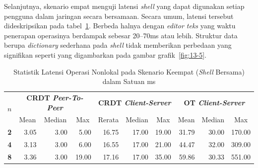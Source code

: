 Selanjutnya, skenario empat menguji latensi \textit{shell} yang dapat digunakan setiap pengguna dalam jaringan secara bersamaan. Secara umum, latensi tersebut dideskripsikan pada tabel~\ref{tab:latency-4}. Berbeda halnya dengan \textit{editor teks} yang waktu penerapan operasinya berdampak sebesar 20--70ms atau lebih. Struktur data berupa \textit{dictionary} sederhana pada \textit{shell} tidak memberikan perbedaan yang signifikan seperti yang digambarkan pada gambar grafik~\ref{fig:13-5}.

\begin{table}[H]
 \centering

 \caption{Statistik Latensi Operasi Nonlokal pada Skenario Keempat (\textit{Shell} Bersama) dalam Satuan ms}
 \label{tab:latency-4}
 \begin{tabular}{|c|rrr|rrr|rrr|}
  \hline
\multirow{2}{*}{$n$} & \multicolumn{3}{c|}{\textbf{CRDT \textit{Peer-To-Peer}}} & \multicolumn{3}{c|}{\textbf{CRDT \textit{Client-Server}}} & \multicolumn{3}{c|}{\textbf{OT \textit{Client-Server}}} \\ \cline{2-10}
 & \multicolumn{1}{c|}{Mean} & \multicolumn{1}{c|}{Median} & \multicolumn{1}{c|}{Max} & \multicolumn{1}{c|}{Rerata} & \multicolumn{1}{c|}{Median} & \multicolumn{1}{c|}{Max} & \multicolumn{1}{c|}{Mean} & \multicolumn{1}{c|}{Median} & \multicolumn{1}{c|}{Max} \\ \hline
\textbf{2} & \multicolumn{1}{r|}{3.05} & \multicolumn{1}{r|}{3.00} & 5.00 & \multicolumn{1}{r|}{16.75} & \multicolumn{1}{r|}{17.00} & 19.00 & \multicolumn{1}{r|}{31.79} & \multicolumn{1}{r|}{30.00} & 170.00 \\ \hline
\textbf{4} & \multicolumn{1}{r|}{3.13} & \multicolumn{1}{r|}{3.00} & 6.00 & \multicolumn{1}{r|}{16.55} & \multicolumn{1}{r|}{17.00} & 21.00 & \multicolumn{1}{r|}{44.47} & \multicolumn{1}{r|}{32.00} & 309.00 \\ \hline
\textbf{8} & \multicolumn{1}{r|}{3.36} & \multicolumn{1}{r|}{3.00} & 19.00 & \multicolumn{1}{r|}{17.16} & \multicolumn{1}{r|}{17.00} & 35.00 & \multicolumn{1}{r|}{59.86} & \multicolumn{1}{r|}{30.33} & 551.00 \\ \hline
\end{tabular}
\end{table}

